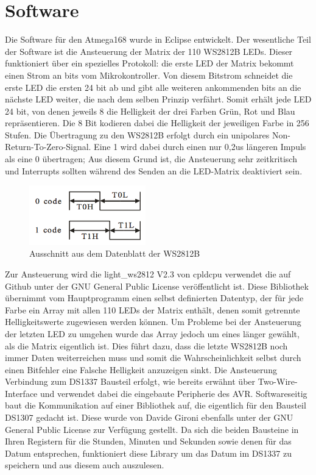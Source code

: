 \documentclass[12pt,journal,compsoc]{IEEEtran}
\begin{document}
\section{Software}
Die Software für den Atmega168 wurde in Eclipse entwickelt. Der wesentliche Teil der Software ist die Ansteuerung der Matrix der 110 WS2812B LEDs. Dieser funktioniert über ein spezielles Protokoll: die erste LED der Matrix bekommt einen Strom an bits vom Mikrokontroller. Von diesem Bitstrom schneidet die erste LED die ersten 24 bit ab und gibt alle weiteren ankommenden bits an die nächste LED weiter, die nach dem selben Prinzip verfährt. Somit erhält jede LED 24 bit, von denen jeweils 8 die Helligkeit der drei Farben Grün, Rot und Blau repräsentieren. Die 8 Bit kodieren dabei die Helligkeit der jeweiligen Farbe in 256 Stufen. Die Übertragung zu den WS2812B erfolgt durch ein unipolares Non-Return-To-Zero-Signal. Eine 1 wird dabei durch einen nur 0,2us längeren Impuls als eine 0 übertragen; Aus diesem Grund ist, die Ansteuerung sehr zeitkritisch und Interrupts sollten während des Senden an die LED-Matrix deaktiviert sein.
\begin{figure}[h]
	\centering
	\includegraphics[width=0.45\textwidth]{Bilder/WS2812Code}
	\caption{Ausschnitt aus dem Datenblatt der WS2812B} 
	\label{fig:WS2812Code}
\end{figure}
Zur Ansteuerung wird die light\_ws2812 V2.3 von cpldcpu verwendet die auf Github unter der GNU General Public License veröffentlicht ist. Diese Bibliothek übernimmt vom Hauptprogramm einen selbst definierten Datentyp, der für jede Farbe ein Array mit allen 110 LEDs der Matrix enthält, denen somit getrennte Helligkeitswerte zugewiesen werden können. Um Probleme bei der Ansteuerung der letzten LED zu umgehen wurde das Array jedoch um eines länger gewählt, als die Matrix eigentlich ist. Dies führt dazu, dass die letzte WS2812B noch immer Daten weiterreichen muss und somit die Wahrscheinlichkeit selbst  durch einen Bitfehler eine Falsche Helligkeit anzuzeigen sinkt.
Die Ansteuerung Verbindung zum DS1337 Bausteil erfolgt, wie bereits erwähnt über Two-Wire-Interface und verwendet dabei die eingebaute Peripherie des AVR. Softwareseitig baut die Kommunikation auf einer Bibliothek auf, die eigentlich für den Bausteil DS1307 gedacht ist. Diese wurde von Davide Gironi  ebenfalls unter der GNU General Public License zur Verfügung gestellt. Da sich die beiden Bausteine in Ihren Registern für die Stunden, Minuten und Sekunden sowie denen für das Datum entsprechen, funktioniert diese Library um das Datum im DS1337 zu speichern und aus diesem auch auszulesen. 
\end{document}
